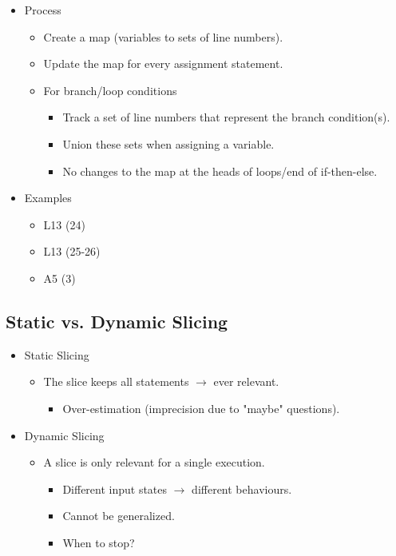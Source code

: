 \documentclass{article}
\begin{document}
\begin{itemize}
    \item Process
    \begin{itemize}
        \item Create a map (variables to sets of line numbers).
        \item Update the map for every assignment statement.
        \item For branch/loop conditions
        \begin{itemize}
            \item Track a set of line numbers that represent the branch condition(s).
            \item Union these sets when assigning a variable.
            \item No changes to the map at the heads of loops/end of if-then-else.
        \end{itemize}
    \end{itemize}
    \item Examples
    \begin{itemize}
        \item L13 (24)
        \item L13 (25-26)
        \item A5 (3)
    \end{itemize}
\end{itemize}

\subsection{Static vs. Dynamic Slicing}

\begin{itemize}
    \item Static Slicing
    \begin{itemize}
        \item The slice keeps all statements $\rightarrow$ ever relevant.
        \begin{itemize}
            \item Over-estimation (imprecision due to "maybe" questions).
        \end{itemize}
    \end{itemize}
    \item Dynamic Slicing
    \begin{itemize}
        \item A slice is only relevant for a single execution.
        \begin{itemize}
            \item Different input states $\rightarrow$ different behaviours.
            \item Cannot be generalized.
            \item When to stop?
        \end{itemize}
    \end{itemize}
\end{itemize}
\end{document}
